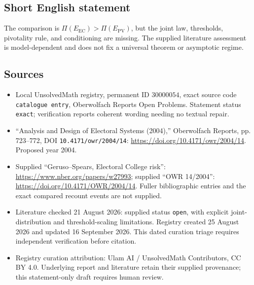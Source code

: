 \documentclass[11pt]{article}
\begin{document}
\subsection{Short English statement}
The comparison is \(\Pi(E_{\mathrm{EC}})>\Pi(E_{\mathrm{PV}})\), but the joint law, thresholds, pivotality rule, and conditioning are missing. The supplied literature assessment is model-dependent and does not fix a universal theorem or asymptotic regime.
\subsection{Sources}
\begin{itemize}
\item Local UnsolvedMath registry, permanent ID \(30000054\), exact source code \texttt{catalogue entry}, Oberwolfach Reports Open Problems. Statement status \texttt{exact}; verification reports coherent wording needing no textual repair.
\item ``Analysis and Design of Electoral Systems (2004),'' Oberwolfach Reports, pp. 723--772, DOI \texttt{10.4171/owr/2004/14}: \url{https://doi.org/10.4171/owr/2004/14}. Proposed year 2004.
\item Supplied ``Geruso--Spears, Electoral College risk'': \url{https://www.nber.org/papers/w27993}; supplied ``OWR 14/2004'': \url{https://doi.org/10.4171/OWR/2004/14}. Fuller bibliographic entries and the exact compared recount events are not supplied.
\item Literature checked 21 August 2026: supplied status \texttt{open}, with explicit joint-distribution and threshold-scaling limitations. Registry created 25 August 2026 and updated 16 September 2026. This dated curation triage requires independent verification before citation.
\item Registry curation attribution: Ulam AI / UnsolvedMath Contributors, CC BY 4.0. Underlying report and literature retain their supplied provenance; this statement-only draft requires human review.
\end{itemize}
\end{document}

